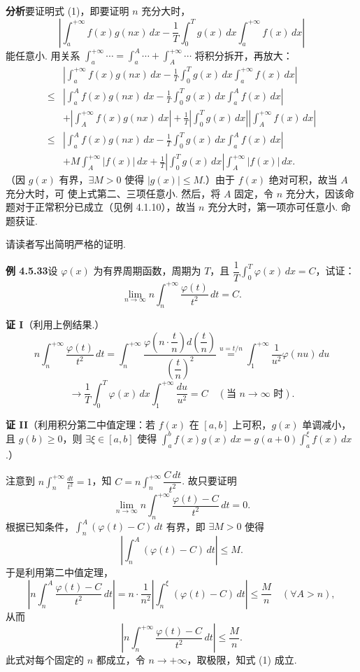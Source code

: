 \documentclass[UTF8, 12pt, fontset=fandol, oneside]{ctexart}
\begin{document}
\noindent\textbf{分析}\quad 要证明式 (1)，即要证明 $n$ 充分大时，
\begin{equation}
\left|\int_a^{+\infty}f(x)g(nx)\,dx-\frac1T\int_0^Tg(x)\,dx\int_a^{+\infty}f(x)\,dx\right| \tag{2}
\end{equation}
能任意小. 用关系 $\displaystyle\int_a^{+\infty}\cdots=\int_a^A\cdots+\int_A^{+\infty}\cdots$ 将积分拆开，再放大：
\[
\begin{aligned}
&\left|\int_a^{+\infty}f(x)g(nx)\,dx-\frac1T\int_0^Tg(x)\,dx\int_a^{+\infty}f(x)\,dx\right|\\
\le{}&
\left|\int_a^A f(x)g(nx)\,dx-\frac1T\int_0^Tg(x)\,dx\int_a^A f(x)\,dx\right|\\
&+\left|\int_A^{+\infty}f(x)g(nx)\,dx\right|
+\frac1T\left|\int_0^Tg(x)\,dx\right|\left|\int_A^{+\infty}f(x)\,dx\right|\\
\le{}&
\left|\int_a^A f(x)g(nx)\,dx-\frac1T\int_0^Tg(x)\,dx\int_a^A f(x)\,dx\right|\\
&+M\int_A^{+\infty}|f(x)|\,dx
+\frac1T\left|\int_0^Tg(x)\,dx\right|\int_A^{+\infty}|f(x)|\,dx.
\end{aligned}
\]
（因 $g(x)$ 有界，$\exists M>0$ 使得 $|g(x)|\le M$.）由于 $f(x)$ 绝对可积，故当 $A$ 充分大时，可
使上式第二、三项任意小. 然后，将 $A$ 固定，令 $n$ 充分大，因该命题对于正常积分已成立（见例 4.1.10），故当 $n$ 充分大时，第一项亦可任意小. 命题获证.

请读者写出简明严格的证明.

\noindent\textbf{例 4.5.33}\quad 设 $\varphi(x)$ 为有界周期函数，周期为 $T$，且 $\dfrac1T\int_0^T\varphi(x)\,dx=C$，试证：
\begin{equation}
\lim_{n\to\infty}n\int_n^{+\infty}\frac{\varphi(t)}{t^2}\,dt=C. \tag{1}
\end{equation}

\noindent\textbf{证 I}\quad （利用上例结果.）
\[
n\int_n^{+\infty}\frac{\varphi(t)}{t^2}\,dt
=\int_n^{+\infty}\frac{\varphi\left(n\cdot\dfrac tn\right)d\left(\dfrac tn\right)}
{\left(\dfrac tn\right)^2}
\stackrel{u=t/n}{=}\int_1^{+\infty}\frac1{u^2}\varphi(nu)\,du
\]
\[
\longrightarrow\frac1T\int_0^T\varphi(x)\,dx\int_1^{+\infty}\frac{du}{u^2}
=C\quad(\text{当 }n\to\infty\text{ 时}).
\]

\noindent\textbf{证 II}\quad （利用积分第二中值定理：若 $f(x)$ 在 $[a,b]$ 上可积，$g(x)$ 单调减小，且
$g(b)\ge0$，则 $\exists\xi\in[a,b]$ 使得 $\displaystyle\int_a^b f(x)g(x)\,dx
=g(a+0)\int_a^\xi f(x)\,dx$.）

注意到 $\displaystyle n\int_n^{+\infty}\frac{dt}{t^2}=1$，知
$C=n\int_n^{+\infty}\dfrac{C\,dt}{t^2}$. 故只要证明
\[
\lim_{n\to\infty}n\int_n^{+\infty}\frac{\varphi(t)-C}{t^2}\,dt=0.
\]
根据已知条件，$\displaystyle\int_n^A(\varphi(t)-C)\,dt$ 有界，即 $\exists M>0$ 使得
\[
\left|\int_n^A(\varphi(t)-C)\,dt\right|\le M.
\]
于是利用第二中值定理，
\[
\left|n\int_n^A\frac{\varphi(t)-C}{t^2}\,dt\right|
=n\cdot\frac1{n^2}\left|\int_n^\xi(\varphi(t)-C)\,dt\right|
\le\frac Mn\quad(\forall A>n),
\]
从而
\[
\left|n\int_n^{+\infty}\frac{\varphi(t)-C}{t^2}\,dt\right|\le\frac Mn.
\]
此式对每个固定的 $n$ 都成立，令 $n\to+\infty$，取极限，知式 (1) 成立.
\end{document}
